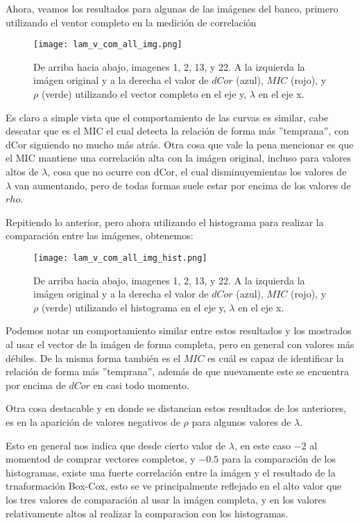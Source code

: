     Ahora, veamos los resultados para algunas de las im\'agenes del banco, primero utilizando el ventor completo en la medici\'on de correlaci\'on  

    \begin{figure}[H]
        \centering
        \texttt{[image: lam\_v\_com\_all\_img.png]}
        \caption{De arriba hacia abajo, imagenes 1, 2, 13, y 22. A la izquierda la im\'agen original y a la derecha el valor de $dCor$ (azul), $MIC$ (rojo), y $\rho$ (verde) utilizando el vector completo en el eje y, $\lambda$ en el eje x.}
    \end{figure}


    Es claro a simple vista que el comportamiento de las curvas es similar, cabe descatar que es el MIC el cual detecta la relaci\'on de forma m\'as ''temprana'', con dCor siguiendo no mucho m\'as atr\'as. Otra cosa que vale la pena mencionar es que el MIC mantiene una correlaci\'on alta con la im\'agen original, incluso para valores altos de $\lambda$, cosa que no ocurre con dCor, el cual disminuyemientas los valores de $\lambda$ van aumentando, pero de todas formas suele estar por encima de los valores de $rho$.

    Repitiendo lo anterior, pero ahora utilizando el histograma para realizar la comparaci\'on entre las im\'agenes, obtenemos:

    \begin{figure}[H]
        \centering
        \texttt{[image: lam\_v\_com\_all\_img\_hist.png]}
        \caption{De arriba hacia abajo, imagenes 1, 2, 13, y 22. A la izquierda la im\'agen original y a la derecha el valor de $dCor$ (azul), $MIC$ (rojo), y $\rho$ (verde) utilizando el histograma en el eje y, $\lambda$ en el eje x.}
    \end{figure}

        Podemos notar un comportamiento similar entre estos resultados y los mostrados al usar el vector de la im\'agen de forma completa, pero en general con valores m\'as d\'ebiles. De la misma forma tambi\'en es el $MIC$ es cu\'al es capaz de identificar la relaci\'on de forma m\'as ''temprana'', adem\'as de que nuevamente este se encuentra por encima de $dCor$ en casi todo momento.

        Otra cosa destacable y en donde se distancian estos resultados de los anteriores, es en la aparici\'on de valores negativos de $\rho$ para algunos valores de $\lambda$. 

        Esto en general nos indica que desde cierto valor de $\lambda$, en este caso $-2$ al momentod de comprar vectores completos, y $-0.5$ para la comparaci\'on de los histogramas, existe una fuerte correlaci\'on entre la im\'agen y el resultado de la trnaformaci\'on Box-Cox, esto se ve principalmente reflejado en el alto valor que los tres valores de comparaci\'on al usar la im\'agen completa, y en los valores relativamente altos al realizar la comparacion con los histogramas. 

